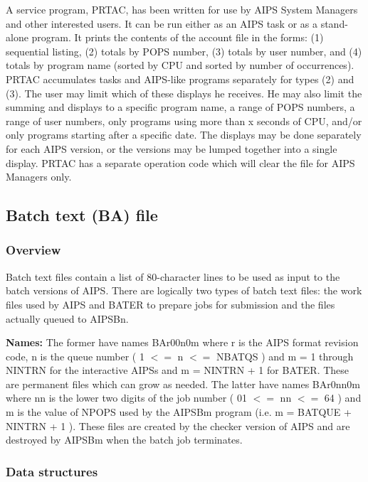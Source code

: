      A service program, PRTAC, has been written for use by AIPS System
Managers and other interested users.  It can be run either as an AIPS
task or as a stand-alone program.  It prints the contents of the
account file in the forms: (1) sequential listing, (2) totals by POPS
number, (3) totals by user number, and (4) totals by program name
(sorted by CPU and sorted by number of occurrences).  PRTAC
accumulates tasks and AIPS-like programs separately for types (2) and
(3).  The user may limit which of these displays he receives.  He may
also limit the summing and displays to a specific program name, a
range of POPS numbers, a range of user numbers, only programs using
more than x seconds of CPU, and/or only programs starting after a
specific date.  The displays may be done separately for each AIPS
version, or the versions may be lumped together into a single display.
PRTAC has a separate operation code which will clear
the file for AIPS Managers only.


\subsection{Batch text (BA) file}

\subsubsection{Overview}

  Batch text files contain a list of 80-character lines to be
used as input to the batch versions of AIPS.  There are logically
two types of batch text files: the work files used by AIPS and
BATER to prepare jobs for submission and the files actually queued
to AIPSBn.

{\bf Names:}  The former have names BAr00n0m where r is the AIPS
format revision code, n is the queue number
( 1 $<=$ n $<=$ NBATQS ) and m = 1 through NINTRN for the interactive
AIPSs and m = NINTRN + 1 for BATER.  These are permanent files
which can grow as needed.  The latter have names BAr0nn0m where nn
is the lower two digits of the job number ( 01 $<=$ nn $<=$ 64 ) and m
is the value of NPOPS used by the AIPSBm program (i.e. m = BATQUE
+ NINTRN + 1 ).  These files are created by the checker version
of AIPS and are destroyed by AIPSBm when the batch job terminates.



\subsubsection{Data structures}



